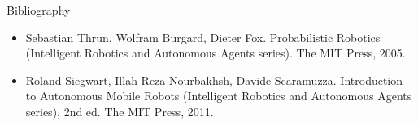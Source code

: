 \documentclass[aspectratio=169]{beamer}
\begin{document}
\begin{frame}[t]{Bibliography}
    \begin{itemize}
        \item Sebastian Thrun, Wolfram Burgard, Dieter Fox. Probabilistic Robotics (Intelligent Robotics and Autonomous Agents series). The MIT Press, 2005.
        \item Roland Siegwart, Illah Reza Nourbakhsh, Davide Scaramuzza. Introduction to Autonomous Mobile Robots (Intelligent Robotics and Autonomous Agents series), 2nd ed. The MIT Press, 2011.
    \end{itemize}

\end{frame}
\end{document}
